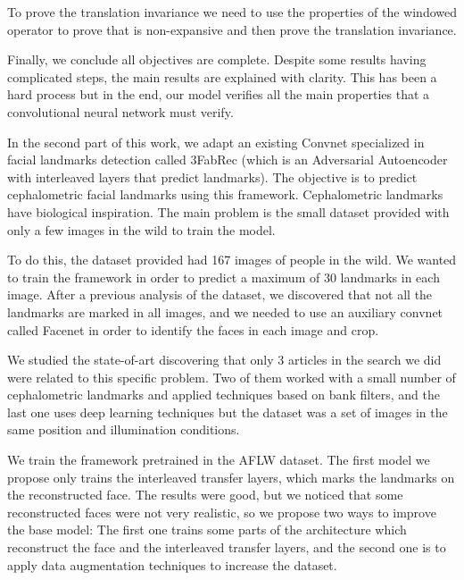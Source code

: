 \medskip

\noindent To prove the translation invariance we need to use the properties of the windowed operator to prove that is non-expansive and then prove the translation invariance.

\medskip

\noindent Finally, we conclude all objectives are complete. Despite some results having complicated steps, the main results are explained with clarity. This has been a hard process but in the end, our model verifies all the main properties that a convolutional neural network must verify.  

\medskip

\noindent In the second part of this work, we adapt an existing Convnet specialized in facial landmarks detection called 3FabRec (which is an Adversarial Autoencoder with interleaved layers that predict landmarks). The objective is to predict cephalometric facial landmarks using this framework. Cephalometric landmarks have biological inspiration. The main problem is the small dataset provided with only a few images in the wild to train the model.

\medskip

\noindent To do this, the dataset provided had 167 images of people in the wild. We wanted to train the framework in order to predict a maximum of $30$ landmarks in each image. After a previous analysis of the dataset, we discovered that not all the landmarks are marked in all images, and we needed to use an auxiliary convnet called Facenet in order to identify the faces in each image and crop.

\medskip

\noindent We studied the state-of-art discovering that only 3 articles in the search we did were related to this specific problem. Two of them worked with a small number of cephalometric landmarks and applied techniques based on bank filters, and the last one uses deep learning techniques but the dataset was a set of images in the same position and illumination conditions. 

\medskip

\noindent We train the framework pretrained in the AFLW dataset. The first model we propose only trains the interleaved transfer layers, which marks the landmarks on the reconstructed face. The results were good, but we noticed that some reconstructed faces were not very realistic, so we propose two ways to improve the base model: The first one trains some parts of the architecture which reconstruct the face and the interleaved transfer layers, and the second one is to apply data augmentation techniques to increase the dataset.

